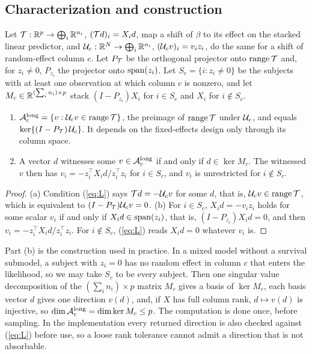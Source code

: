 \subsection{Characterization and construction}

Let $\mathcal{T}: \mathbb{R}^p \to \bigoplus_i \mathbb{R}^{n_i}$, $(\mathcal{T} d)_i = X_i d$, map a shift
of $\beta$ to its effect on the stacked linear predictor, and $\mathcal{U}_c: \mathbb{R}^N
\to \bigoplus_i \mathbb{R}^{n_i}$, $(\mathcal{U}_c v)_i = v_i z_i$, do the same for a shift
of random-effect column $c$. Let $P_{\mathcal{T}}$ be the orthogonal projector onto
$\operatorname{range} \mathcal{T}$ and, for $z_i \neq 0$, $P_{z_i}$ the projector onto
$\operatorname{span}(z_i)$. Let $S_c = \{i : z_i \neq 0\}$ be the subjects with at least
one observation at which column $c$ is nonzero, and let $M_c \in
\mathbb{R}^{(\sum_i n_i) \times p}$ stack $(I - P_{z_i}) X_i$ for $i \in S_c$ and
$X_i$ for $i \notin S_c$.

\begin{proposition}[Characterization]\label{prop:char}
\begin{enumerate}
\item[(a)] $\mathcal{A}_c^{\mathrm{long}} = \{v : \mathcal{U}_c v \in \operatorname{range} \mathcal{T}\}$, the
preimage of $\operatorname{range} \mathcal{T}$ under $\mathcal{U}_c$, and equals $\ker\{(I -
P_{\mathcal{T}})\,\mathcal{U}_c\}$. It depends on the fixed-effects design only
through its column space.
\item[(b)] A vector $d$ witnesses some $v \in \mathcal{A}_c^{\mathrm{long}}$ if and
only if $d \in \ker M_c$. The witnessed $v$ then has $v_i = -z_i^{\top}
X_i d / z_i^{\top} z_i$ for $i \in S_c$, and $v_i$ is unrestricted for
$i \notin S_c$.
\end{enumerate}
\end{proposition}

\begin{proof}
(a) Condition (\ref{eq:L}) says $\mathcal{T} d = -\mathcal{U}_c v$ for some $d$, that is,
$\mathcal{U}_c v \in \operatorname{range} \mathcal{T}$, which is equivalent to $(I - P_{\mathcal{T}})\mathcal{U}_c v = 0$.
(b) For $i \in S_c$, $X_i d = -v_i z_i$ holds for some scalar $v_i$ if and
only if $X_i d \in \operatorname{span}(z_i)$, that is, $(I - P_{z_i}) X_i d = 0$, and then
$v_i = -z_i^{\top} X_i d / z_i^{\top} z_i$. For $i \notin S_c$,
(\ref{eq:L}) reads $X_i d = 0$ whatever $v_i$ is.
\end{proof}

Part (b) is the construction used in practice. In a mixed model without
a survival submodel, a subject with $z_i = 0$ has no random effect in
column $c$ that enters the likelihood, so we may take $S_c$ to be every
subject. Then one singular value decomposition of the $(\sum_i n_i) \times
p$ matrix $M_c$ gives a basis of $\ker M_c$, each basis vector $d$ gives one
direction $v(d)$, and, if $X$ has full column rank, $d \mapsto v(d)$ is
injective, so $\dim \mathcal{A}_c^{\mathrm{long}} = \dim \ker M_c \leq p$. The
computation is done once, before sampling. In the
implementation every returned direction is also checked against
(\ref{eq:L}) before use, so a loose rank tolerance cannot admit a direction
that is not absorbable.

